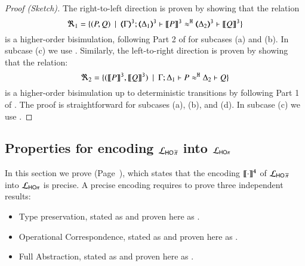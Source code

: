 \begin{proof}[Proof (Sketch)] The right-to-left direction is proven by 
	showing that
	the relation
%
	\[
		\Re_1 = \set{
		(P,Q)
		\setbar \horel{\tmap{\Gamma}{3}}{\tmap{\Delta_1}{3}}{\pmap{P}{3}}{\hwb}{\tmap{\Delta_2}{3}}{\pmap{Q}{3}}}
	\]
%
	  is a higher-order bisimulation, following Part 2 of
		 for subcases (a) and (b).
		In subcase (c) we  use .
		Similarly, the left-to-right direction is proven by showing that 
the relation:
%
	\[
		\Re_2 = \{
		(\llbracket P\rrbracket^\mathtt{3}, \llbracket Q\rrbracket^\mathtt{3})
		\ \ |\ \  \Gamma; \Delta_1 \vdash P \approx^\mathtt{H} \Delta_2 \vdash Q\}
	\]
 is a higher-order bisimulation up to deterministic transitions
		by following Part 1 of .
		The proof is straightforward for subcases (a), (b), and (d).
		In subcase (c) we  use  .
\end{proof}






\subsection{Properties for encoding $\mathcal{L}_{\mathsf{HO}\,{\widetilde{\pi}}}$ into $\mathcal{L}_{\mathsf{HO}\pi}$}
\label{app:pHOp_to_HOp}



In this section we prove  (Page~\pageref{f:enc:phopiptohopi}),
which states that the encoding $\llbracket\cdot\rrbracket^\mathtt{4}$ of
$\mathcal{L}_{\mathsf{HO}\,{\widetilde{\pi}}}$ into $\mathcal{L}_{\mathsf{HO}\pi}$ is precise.
A precise encoding requires to prove three independent results:
\begin{itemize}
	\item	Type preservation, stated as  and proven here as .
	\item	Operational Correspondence, stated as  and proven here as .
	\item	Full Abstraction, stated as  and proven here  as .
\end{itemize}


